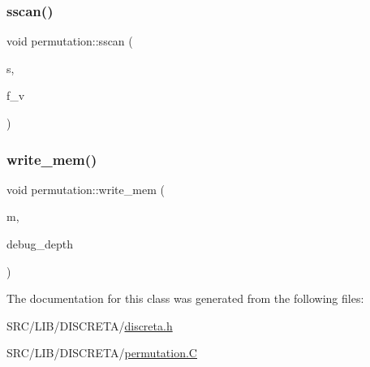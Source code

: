 \mbox{\label{classpermutation_a7074b329f809b23ba083e1a74b90bd03}} 
\subsubsection{\texorpdfstring{sscan()}{sscan()}}
{\footnotesize\ttfamily void permutation\+::sscan (\begin{DoxyParamCaption}\item[{const char $\ast$}]{s,  }\item[{\mbox{\hyperlink{galois_8h_a09fddde158a3a20bd2dcadb609de11dc}{I\+NT}}}]{f\+\_\+v }\end{DoxyParamCaption})}

\mbox{\label{classpermutation_af4fd9ef2f599afdac92272358c4b8665}} 
\subsubsection{\texorpdfstring{write\+\_\+mem()}{write\_mem()}}
{\footnotesize\ttfamily void permutation\+::write\+\_\+mem (\begin{DoxyParamCaption}\item[{\mbox{\hyperlink{classmemory}{memory}} \&}]{m,  }\item[{\mbox{\hyperlink{galois_8h_a09fddde158a3a20bd2dcadb609de11dc}{I\+NT}}}]{debug\+\_\+depth }\end{DoxyParamCaption})}



The documentation for this class was generated from the following files\+:\begin{DoxyCompactItemize}
\item 
S\+R\+C/\+L\+I\+B/\+D\+I\+S\+C\+R\+E\+T\+A/\mbox{\hyperlink{discreta_8h}{discreta.\+h}}\item 
S\+R\+C/\+L\+I\+B/\+D\+I\+S\+C\+R\+E\+T\+A/\mbox{\hyperlink{permutation_8_c}{permutation.\+C}}\end{DoxyCompactItemize}
